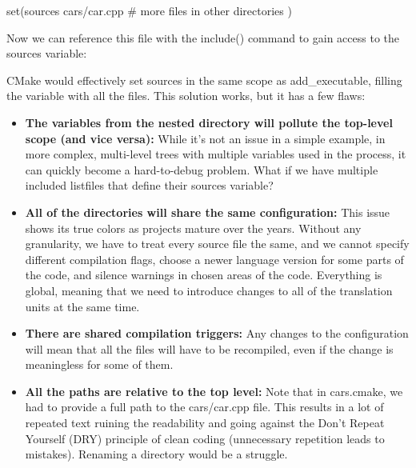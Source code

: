 
\begin{cmake}
set(sources
    cars/car.cpp
    # more files in other directories
)
\end{cmake}

Now we can reference this file with the include() command to gain access to the sources variable:



CMake would effectively set sources in the same scope as add\_executable, filling the variable with all the files. This solution works, but it has a few flaws:

\begin{itemize}
\item
\textbf{The variables from the nested directory will pollute the top-level scope (and vice versa):} While it’s not an issue in a simple example, in more complex, multi-level trees with multiple variables used in the process, it can quickly become a hard-to-debug problem. What if we have multiple included listfiles that define their sources variable?

\item
\textbf{All of the directories will share the same configuration: }This issue shows its true colors as projects mature over the years. Without any granularity, we have to treat every source file the same, and we cannot specify different compilation flags, choose a newer language version for some parts of the code, and silence warnings in chosen areas of the code. Everything is global, meaning that we need to introduce changes to all of the translation units at the same time.

\item
\textbf{There are shared compilation triggers:} Any changes to the configuration will mean that all the files will have to be recompiled, even if the change is meaningless for some of them.

\item
\textbf{All the paths are relative to the top level:} Note that in cars.cmake, we had to provide a full path to the cars/car.cpp file. This results in a lot of repeated text ruining the readability and going against the Don’t Repeat Yourself (DRY) principle of clean coding (unnecessary repetition leads to mistakes).
Renaming a directory would be a struggle.
\end{itemize}


